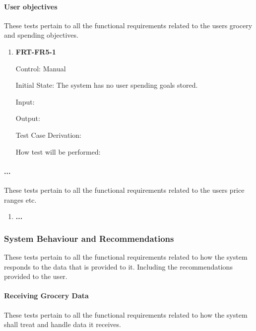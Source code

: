 \documentclass[12pt, titlepage]{article}
\begin{document}
\paragraph{User objectives}

These tests pertain to all the functional requirements related to the users grocery and spending objectives.

\begin{enumerate}

\item{\textbf{FRT-FR5-1}}

Control: Manual
          
Initial State: The system has no user spending goals stored.

Input: 
          
Output: 

Test Case Derivation: 
          
How test will be performed: 

\end{enumerate}

\paragraph{...} %

These tests pertain to all the functional requirements related to the users price ranges etc. %

\begin{enumerate}

\item{\textbf{...}}

\end{enumerate}

\subsubsection{System Behaviour and Recommendations}

These tests pertain to all the functional requirements related to how the system responds to the data that is provided to it. Including the recommendations provided to the user.

\paragraph{Receiving Grocery Data}

These tests pertain to all the functional requirements related to how the system shall treat and handle data it receives.
\end{document}
